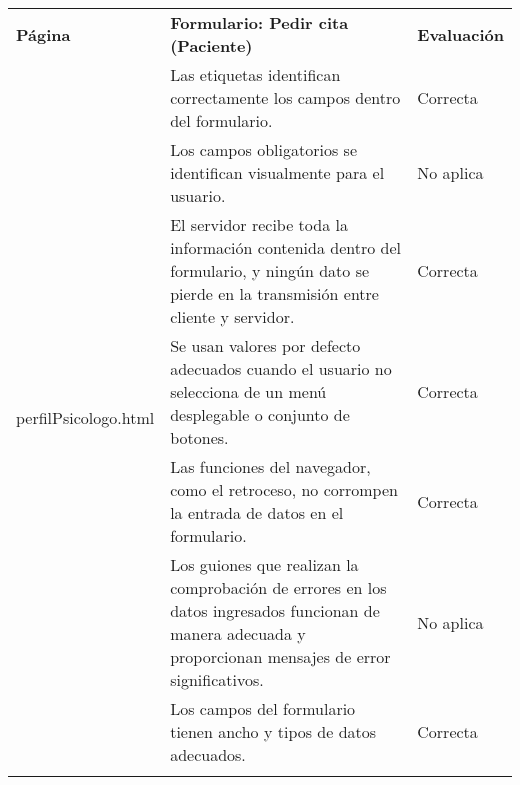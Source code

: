 \begin{table}[htpb]
\centering
\begin{tabularx}{\textwidth}{|l|X|l|}
\hline
\rowcolor[gray]{0.9}\multicolumn{3}{|l|}{\textbf{Anexo PI-010}}                                                                                                                                                                               \\ \hline
\textbf{Página}                        & \textbf{Formulario: Pedir cita (Paciente)}                                                                                                                & \textbf{Evaluación} \\ \hline
\multirow{10}{*}{perfilPsicologo.html} & Las etiquetas identifican correctamente los campos dentro del formulario.                                                                                 & Correcta            \\ \cline{2-3} 
                                       & Los campos obligatorios se identifican visualmente para el usuario.                                                                                       & No aplica           \\ \cline{2-3} 
                                       & El servidor recibe toda la información contenida dentro del formulario, y ningún dato se pierde en la transmisión entre cliente y servidor.               & Correcta            \\ \cline{2-3} 
                                       & Se usan valores por defecto adecuados cuando el usuario no selecciona de un menú desplegable o conjunto de botones.                                       & Correcta            \\ \cline{2-3} 
                                       & Las funciones del navegador, como el retroceso, no corrompen la entrada de datos en el formulario.                                                        & Correcta            \\ \cline{2-3} 
                                       & Los guiones que realizan la comprobación de errores en los datos ingresados funcionan de manera adecuada y proporcionan mensajes de error significativos. & No aplica           \\ \cline{2-3} 
                                       & Los campos del formulario tienen ancho y tipos de datos adecuados.                                                                                        & Correcta            \\ \cline{2-3} 

\end{tabularx}
\end{table}
